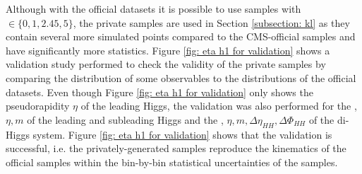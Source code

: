 Although with the official datasets it is possible to use samples with \kl $\in \{0,1,2.45,5\}$, the private samples are used in Section \ref{subsection: kl} as they contain several more \kl simulated points compared to the CMS-official samples and have significantly more statistics. Figure \ref{fig: eta h1 for validation} shows a validation study performed to check the validity of the private samples by comparing the distribution of some observables to the distributions of the official datasets. Even though Figure \ref{fig: eta h1 for validation} only shows the pseudorapidity $\eta$ of the leading Higgs, the validation was also performed for the \pt, $\eta, m $ of the leading and subleading Higgs and the \pt, $\eta, m, \Delta \eta_{HH}, \Delta \Phi_{HH} $ of the di-Higgs system. Figure \ref{fig: eta h1 for validation} shows that the validation is successful, i.e. the privately-generated samples reproduce the kinematics of the official samples within the bin-by-bin statistical uncertainties of the samples.

